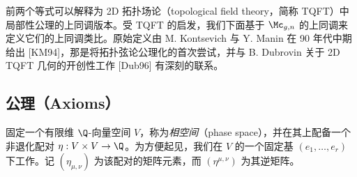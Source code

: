 前两个等式可以解释为 2D 拓扑场论（topological field theory，简称 TQFT）中局部性公理的上同调版本。受 TQFT 的启发，我们下面基于 $\Mc_{g,n}$ 的上同调来定义它们的上同调类比。原始定义由 M. Kontsevich 与 Y. Manin 在 90 年代中期给出 [KM94]，那是将拓扑弦论公理化的首次尝试，并与 B. Dubrovin 关于 2D TQFT 几何的开创性工作 [Dub96] 有深刻的联系。

\subsection{公理（Axioms）}

固定一个有限维 $\Q$-向量空间 $V$，称为\emph{相空间}（phase space），并在其上配备一个非退化配对 $\eta:V\times V\to\Q$。为方便起见，我们在 $V$ 的一个固定基 $(e_{1},\dots,e_{r})$ 下工作。记 $(\eta_{\mu,\nu})$ 为该配对的矩阵元素，而 $(\eta^{\mu,\nu})$ 为其逆矩阵。

